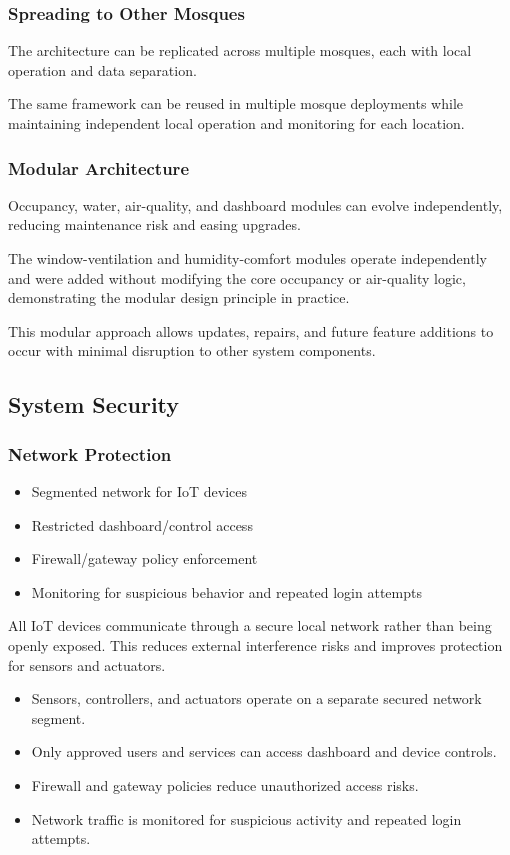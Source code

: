 \subsubsection{Spreading to Other Mosques}
The architecture can be replicated across multiple mosques, each with local operation and data separation.

The same framework can be reused in multiple mosque deployments while maintaining independent local operation and monitoring for each location.

\subsubsection{Modular Architecture}
Occupancy, water, air-quality, and dashboard modules can evolve independently, reducing maintenance risk and easing upgrades.

The window-ventilation and humidity-comfort modules operate independently and were added without modifying the core occupancy or air-quality logic, demonstrating the modular design principle in practice.

This modular approach allows updates, repairs, and future feature additions to occur with minimal disruption to other system components.

\subsection{System Security}

\subsubsection{Network Protection}
\begin{itemize}
  \item Segmented network for IoT devices
  \item Restricted dashboard/control access
  \item Firewall/gateway policy enforcement
  \item Monitoring for suspicious behavior and repeated login attempts
\end{itemize}

All IoT devices communicate through a secure local network rather than being openly exposed. This reduces external interference risks and improves protection for sensors and actuators.

\begin{itemize}
  \item Sensors, controllers, and actuators operate on a separate secured network segment.
  \item Only approved users and services can access dashboard and device controls.
  \item Firewall and gateway policies reduce unauthorized access risks.
  \item Network traffic is monitored for suspicious activity and repeated login attempts.
\end{itemize}

